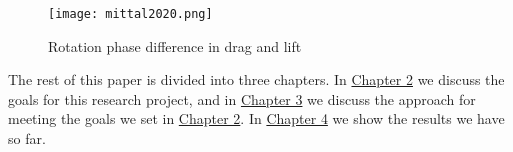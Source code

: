 \begin{figure}[htbp]
\centering
\texttt{[image: mittal2020.png]}
\caption{Rotation phase difference in drag and lift \cite{mittal_direct_2020}}
\label{fig:mittal2020}
\end{figure}

The rest of this paper is divided into three chapters. In \hyperref[chp:Objectives]{Chapter 2} we discuss the goals for this research project, and in \hyperref[chp:Approach]{Chapter 3} we discuss the approach for meeting the goals we set in \hyperref[chp:Objectives]{Chapter 2}. In \hyperref[chp:Results]{Chapter 4} we show the results we have so far. 
\\

%
%
%			
